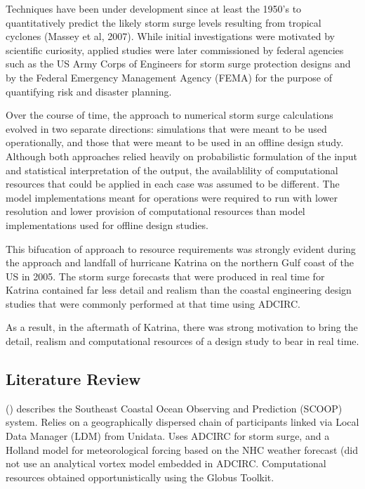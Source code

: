 \documentclass[12pt]{article}
\begin{document}
Techniques have been under development since at least the 1950’s to 
quantitatively predict the likely storm surge levels resulting from 
tropical cyclones (Massey et al, 2007). While initial investigations 
were motivated by scientific curiosity, applied studies were later 
commissioned by federal agencies such as the US Army Corps of 
Engineers for storm surge protection designs and by the Federal 
Emergency Management Agency (FEMA) for the purpose of quantifying 
risk and disaster planning. 

Over the course of time, the approach to numerical storm surge 
calculations evolved in two separate directions: simulations that 
were meant to be used operationally, and those that were meant to be 
used in an offline design study. Although both approaches relied 
heavily on probabilistic formulation of the input and statistical 
interpretation of the output, the availablility of computational 
resources that could be applied in each case was assumed to be 
different. The model implementations meant for operations were 
required to run with lower resolution and lower provision of 
computational resources than model implementations used for offline 
design studies. 

This bifucation of approach to resource requirements was strongly 
evident during the approach and landfall of hurricane Katrina on the 
northern Gulf coast of the US in 2005. The storm surge forecasts 
that were produced in real time for Katrina contained far less 
detail and realism than the coastal engineering design studies that 
were commonly performed at that time using ADCIRC. 

As a result, in the aftermath of Katrina, there was strong 
motivation to bring the detail, realism and computational resources 
of a design study to bear in real time.  

\subsection{Literature Review}

(\cite{RamakrishnanL2006}) describes the Southeast Coastal Ocean 
Observing and Prediction (SCOOP) system. Relies on a geographically 
dispersed chain of participants linked via Local Data Manager (LDM) 
from Unidata. Uses ADCIRC for storm surge, and a Holland model for 
meteorological forcing based on the NHC weather forecast (did not 
use an analytical vortex model embedded in ADCIRC. Computational 
resources obtained opportunistically using the Globus Toolkit. 
\end{document}
